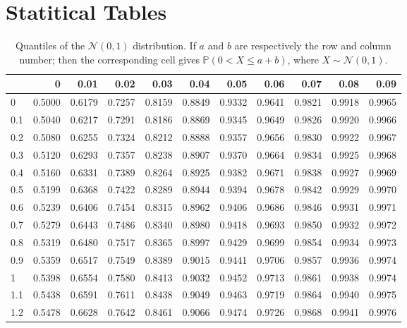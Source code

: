 \documentclass[
]{book}
\theoremstyle{definition}
\theoremstyle{definition}
\theoremstyle{definition}
\theoremstyle{definition}
\theoremstyle{remark}
\begin{document}
\hypertarget{statitical-tables}{%
\section{Statitical Tables}\label{statitical-tables}}

\begin{table}

\caption{\label{tab:Normal}Quantiles of the $\mathcal{N}(0,1)$ distribution. If $a$ and $b$ are respectively the row and column number; then the corresponding cell gives $\mathbb{P}(0<X\le a+b)$, where $X \sim \mathcal{N}(0,1)$.}
\centering
\begin{tabular}[t]{l|r|r|r|r|r|r|r|r|r|r}
\hline
  & 0 & 0.01 & 0.02 & 0.03 & 0.04 & 0.05 & 0.06 & 0.07 & 0.08 & 0.09\\
\hline
0 & 0.5000 & 0.6179 & 0.7257 & 0.8159 & 0.8849 & 0.9332 & 0.9641 & 0.9821 & 0.9918 & 0.9965\\
\hline
0.1 & 0.5040 & 0.6217 & 0.7291 & 0.8186 & 0.8869 & 0.9345 & 0.9649 & 0.9826 & 0.9920 & 0.9966\\
\hline
0.2 & 0.5080 & 0.6255 & 0.7324 & 0.8212 & 0.8888 & 0.9357 & 0.9656 & 0.9830 & 0.9922 & 0.9967\\
\hline
0.3 & 0.5120 & 0.6293 & 0.7357 & 0.8238 & 0.8907 & 0.9370 & 0.9664 & 0.9834 & 0.9925 & 0.9968\\
\hline
0.4 & 0.5160 & 0.6331 & 0.7389 & 0.8264 & 0.8925 & 0.9382 & 0.9671 & 0.9838 & 0.9927 & 0.9969\\
\hline
0.5 & 0.5199 & 0.6368 & 0.7422 & 0.8289 & 0.8944 & 0.9394 & 0.9678 & 0.9842 & 0.9929 & 0.9970\\
\hline
0.6 & 0.5239 & 0.6406 & 0.7454 & 0.8315 & 0.8962 & 0.9406 & 0.9686 & 0.9846 & 0.9931 & 0.9971\\
\hline
0.7 & 0.5279 & 0.6443 & 0.7486 & 0.8340 & 0.8980 & 0.9418 & 0.9693 & 0.9850 & 0.9932 & 0.9972\\
\hline
0.8 & 0.5319 & 0.6480 & 0.7517 & 0.8365 & 0.8997 & 0.9429 & 0.9699 & 0.9854 & 0.9934 & 0.9973\\
\hline
0.9 & 0.5359 & 0.6517 & 0.7549 & 0.8389 & 0.9015 & 0.9441 & 0.9706 & 0.9857 & 0.9936 & 0.9974\\
\hline
1 & 0.5398 & 0.6554 & 0.7580 & 0.8413 & 0.9032 & 0.9452 & 0.9713 & 0.9861 & 0.9938 & 0.9974\\
\hline
1.1 & 0.5438 & 0.6591 & 0.7611 & 0.8438 & 0.9049 & 0.9463 & 0.9719 & 0.9864 & 0.9940 & 0.9975\\
\hline
1.2 & 0.5478 & 0.6628 & 0.7642 & 0.8461 & 0.9066 & 0.9474 & 0.9726 & 0.9868 & 0.9941 & 0.9976\\

\end{tabular}
\end{table}
\end{document}
